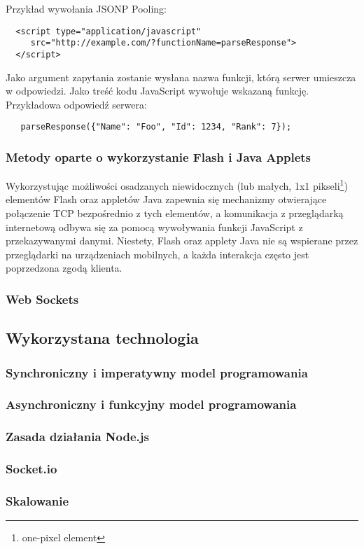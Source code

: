\begin{description}
  Przykład wywołania JSONP Pooling:
\lstset{language=HTML}
\begin{lstlisting}
  <script type="application/javascript"
     src="http://example.com/?functionName=parseResponse">
  </script>
\end{lstlisting}
  
  Jako argument zapytania zostanie wysłana nazwa funkcji, którą serwer umieszcza w odpowiedzi. Jako treść kodu JavaScript wywołuje wskazaną funkcję. Przykładowa odpowiedź serwera:

\lstset{language=JavaScript}
\begin{lstlisting}
   parseResponse({"Name": "Foo", "Id": 1234, "Rank": 7});
\end{lstlisting}

\end{description}

\subsubsection{Metody oparte o wykorzystanie Flash i Java Applets}

Wykorzystując możliwości osadzanych niewidocznych (lub małych, 1x1 pikseli\footnote{one-pixel element}) elementów Flash oraz appletów Java zapewnia się mechanizmy otwierające połączenie TCP bezpośrednio z tych elementów, a komunikacja z przeglądarką internetową odbywa się za pomocą wywoływania funkcji JavaScript z przekazywanymi danymi. Niestety, Flash oraz applety Java nie są wspierane przez przeglądarki na urządzeniach mobilnych, a każda interakcja często jest poprzedzona zgodą klienta.

\subsubsection{Web Sockets}
\label{subsub:websockets}

% 

\subsection{Wykorzystana technologia}

\subsubsection{Synchroniczny i imperatywny model programowania}

\subsubsection{Asynchroniczny i funkcyjny model programowania}

\subsubsection{Zasada działania Node.js}

\subsubsection{Socket.io}
\label{subsub:socketio}

\subsubsection{Skalowanie}
\label{subsub:scalability}

